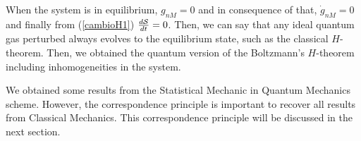When the system is in equilibrium, $g_{nM}=0$ and in consequence of that, $\dot
g_{nM}=0$ and finally from (\ref{cambioH1}) $\frac{d\mathcal{S}}{dt}=0$. Then, we can
say that any ideal quantum gas perturbed always evolves to the equilibrium
state, such as the classical $H$-theorem. Then, we obtained the quantum version
of the Boltzmann's $H$-theorem including inhomogeneities in the system.

We obtained some results from the Statistical Mechanic in Quantum Mechanics
scheme. However, the correspondence principle is important to recover all
results from Classical Mechanics. This correspondence principle will be
discussed in the next section.

 


